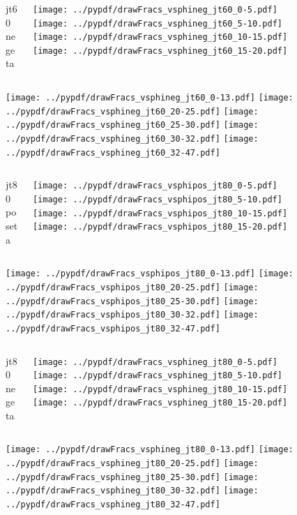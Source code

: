 \documentclass[aspectratio=169]{beamer}
\begin{document}
\begin{figure}[p]
\flushleft
\begin{columns}[T]
\begin{column}{.2\linewidth}
\centering
jt60 negeta
\end{column}
\begin{column}{.8\linewidth}
\texttt{[image: ../pypdf/drawFracs\_vsphineg\_jt60\_0-5.pdf]}
\texttt{[image: ../pypdf/drawFracs\_vsphineg\_jt60\_5-10.pdf]}
\texttt{[image: ../pypdf/drawFracs\_vsphineg\_jt60\_10-15.pdf]}
\texttt{[image: ../pypdf/drawFracs\_vsphineg\_jt60\_15-20.pdf]}
\end{column}
\end{columns}
\texttt{[image: ../pypdf/drawFracs\_vsphineg\_jt60\_0-13.pdf]}
\texttt{[image: ../pypdf/drawFracs\_vsphineg\_jt60\_20-25.pdf]}
\texttt{[image: ../pypdf/drawFracs\_vsphineg\_jt60\_25-30.pdf]}
\texttt{[image: ../pypdf/drawFracs\_vsphineg\_jt60\_30-32.pdf]}
\texttt{[image: ../pypdf/drawFracs\_vsphineg\_jt60\_32-47.pdf]}
\end{figure}

\begin{figure}[p]
\flushleft
\begin{columns}[T]
\begin{column}{.2\linewidth}
\centering
jt80 poseta
\end{column}
\begin{column}{.8\linewidth}
\texttt{[image: ../pypdf/drawFracs\_vsphipos\_jt80\_0-5.pdf]}
\texttt{[image: ../pypdf/drawFracs\_vsphipos\_jt80\_5-10.pdf]}
\texttt{[image: ../pypdf/drawFracs\_vsphipos\_jt80\_10-15.pdf]}
\texttt{[image: ../pypdf/drawFracs\_vsphipos\_jt80\_15-20.pdf]}
\end{column}
\end{columns}
\texttt{[image: ../pypdf/drawFracs\_vsphipos\_jt80\_0-13.pdf]}
\texttt{[image: ../pypdf/drawFracs\_vsphipos\_jt80\_20-25.pdf]}
\texttt{[image: ../pypdf/drawFracs\_vsphipos\_jt80\_25-30.pdf]}
\texttt{[image: ../pypdf/drawFracs\_vsphipos\_jt80\_30-32.pdf]}
\texttt{[image: ../pypdf/drawFracs\_vsphipos\_jt80\_32-47.pdf]}
\end{figure}

\begin{figure}[p]
\flushleft
\begin{columns}[T]
\begin{column}{.2\linewidth}
\centering
jt80 negeta
\end{column}
\begin{column}{.8\linewidth}
\texttt{[image: ../pypdf/drawFracs\_vsphineg\_jt80\_0-5.pdf]}
\texttt{[image: ../pypdf/drawFracs\_vsphineg\_jt80\_5-10.pdf]}
\texttt{[image: ../pypdf/drawFracs\_vsphineg\_jt80\_10-15.pdf]}
\texttt{[image: ../pypdf/drawFracs\_vsphineg\_jt80\_15-20.pdf]}
\end{column}
\end{columns}
\texttt{[image: ../pypdf/drawFracs\_vsphineg\_jt80\_0-13.pdf]}
\texttt{[image: ../pypdf/drawFracs\_vsphineg\_jt80\_20-25.pdf]}
\texttt{[image: ../pypdf/drawFracs\_vsphineg\_jt80\_25-30.pdf]}
\texttt{[image: ../pypdf/drawFracs\_vsphineg\_jt80\_30-32.pdf]}
\texttt{[image: ../pypdf/drawFracs\_vsphineg\_jt80\_32-47.pdf]}
\end{figure}
\end{document}

